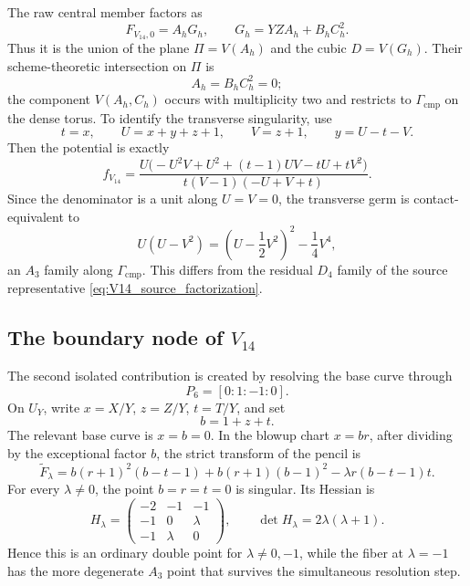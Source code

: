 \documentclass[11pt]{amsart}
\theoremstyle{definition}
\theoremstyle{remark}
\begin{document}
The raw central member factors as
\begin{equation}
\label{eq:V14_raw_central_factorization}
F_{V_{14},0}=A_hG_h,
\qquad
G_h=YZ A_h+B_hC_h^2.
\end{equation}
Thus it is the union of the plane $\Pi=V(A_h)$ and the cubic
$D=V(G_h)$.  Their scheme-theoretic intersection on $\Pi$ is
\[
A_h=B_hC_h^2=0;
\]
the component $V(A_h,C_h)$ occurs with multiplicity two and restricts to
$\Gamma_{\mathrm{cmp}}$ on the dense torus.  To identify the transverse
singularity, use
\[
t=x,
\qquad
U=x+y+z+1,
\qquad
V=z+1,
\qquad
y=U-t-V.
\]
Then the potential is exactly
\begin{equation}
\label{eq:V14_compact_local_equation}
f_{V_{14}}
=
\frac{U\bigl(-U^2V+U^2+(t-1)UV-tU+tV^2\bigr)}
{t(V-1)(-U+V+t)}.
\end{equation}
Since the denominator is a unit along $U=V=0$, the transverse germ is
contact-equivalent to
\[
U(U-V^2)
=
\left(U-\frac12V^2\right)^2-\frac14V^4,
\]
an $A_3$ family along $\Gamma_{\mathrm{cmp}}$.  This differs from the
residual $D_4$ family of the source representative
\eqref{eq:V14_source_factorization}.

\subsection{The boundary node of \texorpdfstring{$V_{14}$}{V14}}

The second isolated contribution is created by resolving the base curve
through
\[
P_6=[0:1:-1:0].
\]
On $U_Y$, write $x=X/Y$, $z=Z/Y$, $t=T/Y$, and set
\[
b=1+z+t.
\]
The relevant base curve is $x=b=0$.  In the blowup chart $x=br$, after
dividing by the exceptional factor $b$, the strict transform of the pencil is
\begin{equation}
\label{eq:V14_first_blowup_equation}
\widetilde F_\lambda
=
b(r+1)^2(b-t-1)
+b(r+1)(b-1)^2
-\lambda r(b-t-1)t.
\end{equation}
For every $\lambda\neq0$, the point $b=r=t=0$ is singular.  Its Hessian is
\[
H_\lambda=
\begin{pmatrix}
-2&-1&-1\\
-1&0&\lambda\\
-1&\lambda&0
\end{pmatrix},
\qquad
\det H_\lambda=2\lambda(\lambda+1).
\]
Hence this is an ordinary double point for $\lambda\neq0,-1$, while the
fiber at $\lambda=-1$ has the more degenerate $A_3$ point that survives the
simultaneous resolution step.
\end{document}
